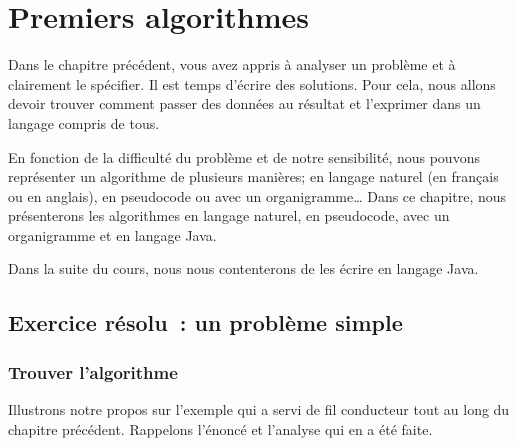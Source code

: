 \chapter{Premiers algorithmes}
\label{premalgos}

	Dans le chapitre précédent, vous avez appris à analyser un problème et
	à clairement le spécifier.  Il est temps d’écrire des solutions.  Pour cela,
	nous allons devoir trouver comment passer des données au résultat et
	l’exprimer dans un langage compris de tous.
	
	En fonction de la difficulté du problème et de notre sensibilité, nous
	pouvons représenter un algorithme de plusieurs manières; en langage naturel
	(en français ou en 	anglais), en pseudocode ou avec un organigramme\ldots
	Dans ce chapitre, nous présenterons les algorithmes en langage naturel, en
	pseudocode, avec un organigramme et en langage Java. 

	Dans la suite du cours, nous nous contenterons de les écrire en langage Java. 

	\newpage
	\minitoc
	\newpage
	
	\section{Exercice résolu~: un problème simple}
	\label{exerciceresolu}
	
		\subsection{Trouver l’algorithme}

			Illustrons notre propos sur l’exemple qui a servi de fil conducteur
			tout au long du chapitre précédent.  Rappelons l’énoncé et l’analyse
			qui en a été faite.
			
